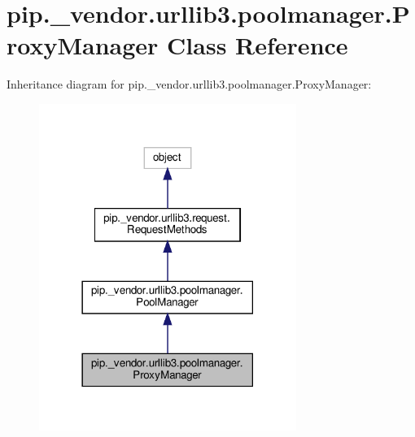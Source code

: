 \hypertarget{classpip_1_1__vendor_1_1urllib3_1_1poolmanager_1_1ProxyManager}{}\section{pip.\+\_\+vendor.\+urllib3.\+poolmanager.\+Proxy\+Manager Class Reference}
\label{classpip_1_1__vendor_1_1urllib3_1_1poolmanager_1_1ProxyManager}


Inheritance diagram for pip.\+\_\+vendor.\+urllib3.\+poolmanager.\+Proxy\+Manager\+:
\nopagebreak
\begin{figure}[H]
\begin{center}
\leavevmode
\includegraphics[width=237pt]{classpip_1_1__vendor_1_1urllib3_1_1poolmanager_1_1ProxyManager__inherit__graph}
\end{center}
\end{figure}


